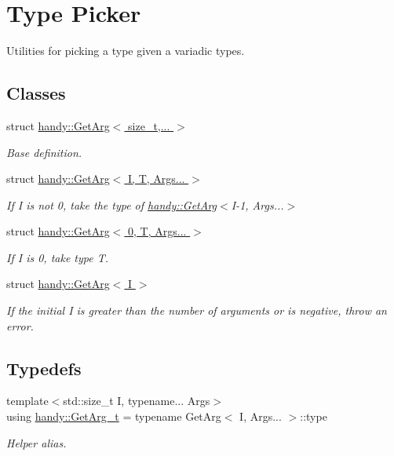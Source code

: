 \hypertarget{group__GetArgGroup}{}\section{Type Picker}
\label{group__GetArgGroup}


Utilities for picking a type given a variadic types.  


\subsection*{Classes}
\begin{DoxyCompactItemize}
\item 
struct \hyperlink{structhandy_1_1GetArg}{handy\+::\+Get\+Arg$<$ size\+\_\+t,... $>$}
\begin{DoxyCompactList}\small\item\em Base definition. \end{DoxyCompactList}\item 
struct \hyperlink{structhandy_1_1GetArg_3_01I_00_01T_00_01Args_8_8_8_01_4}{handy\+::\+Get\+Arg$<$ I, T, Args... $>$}
\begin{DoxyCompactList}\small\item\em If {\ttfamily I} is not 0, take the type of \hyperlink{structhandy_1_1GetArg}{handy\+::\+Get\+Arg}$<$I-\/1, Args...$>$ \end{DoxyCompactList}\item 
struct \hyperlink{structhandy_1_1GetArg_3_010_00_01T_00_01Args_8_8_8_01_4}{handy\+::\+Get\+Arg$<$ 0, T, Args... $>$}
\begin{DoxyCompactList}\small\item\em If {\ttfamily I} is 0, take type {\ttfamily T}. \end{DoxyCompactList}\item 
struct \hyperlink{structhandy_1_1GetArg_3_01I_01_4}{handy\+::\+Get\+Arg$<$ I $>$}
\begin{DoxyCompactList}\small\item\em If the initial {\ttfamily I} is greater than the number of arguments or is negative, throw an error. \end{DoxyCompactList}\end{DoxyCompactItemize}
\subsection*{Typedefs}
\begin{DoxyCompactItemize}
\item 
{\footnotesize template$<$std\+::size\+\_\+t I, typename... Args$>$ }\\using \hyperlink{group__GetArgGroup_gaed885c745628529b328db1c511d841fc}{handy\+::\+Get\+Arg\+\_\+t} = typename Get\+Arg$<$ I, Args... $>$\+::type
\begin{DoxyCompactList}\small\item\em Helper alias. \end{DoxyCompactList}\end{DoxyCompactItemize}


